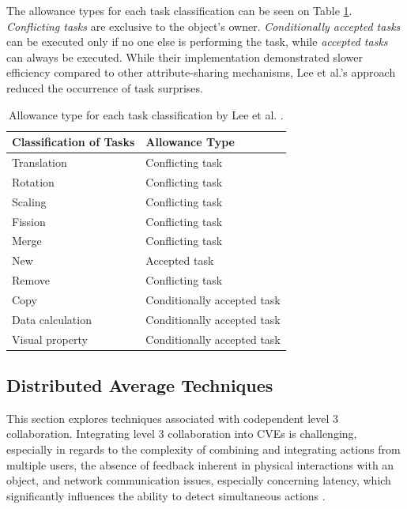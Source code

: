      The allowance types for each task classification can be seen on Table \ref{tab:sota_finegrained}. \textit{Conflicting tasks} are exclusive to the object's owner. \textit{Conditionally accepted tasks} can be executed only if no one else is performing the task, while \textit{accepted tasks} can always be executed. While their implementation demonstrated slower efficiency compared to other attribute-sharing mechanisms, Lee et al.'s approach reduced the occurrence of task surprises.

    \begin{table}[h!]
        \centering
       \caption{Allowance type for each task classification by Lee et al. \cite{leeSupportingFineGrainedConcurrent2012}.}
        \begin{tabular}{m{12em} l}
            \hline
            Classification of Tasks & Allowance Type  \\
            \hline
            Translation & Conflicting task \\
            Rotation & Conflicting task \\
            Scaling & Conflicting task \\
            Fission & Conflicting task \\
            Merge & Conflicting task \\
            New & Accepted task \\
            Remove & Conflicting task \\
            Copy & Conditionally accepted task \\
            Data calculation & Conditionally accepted task \\
            Visual property & Conditionally accepted task \\
        \end{tabular}
 
        \label{tab:sota_finegrained}
    \end{table}
    
    \subsection{Distributed Average Techniques} \label{sec:average_concurrency}

    This section explores techniques associated with codependent level 3 collaboration. Integrating level 3 collaboration into CVEs is challenging, especially in regards to the complexity of combining and integrating actions from multiple users, the absence of feedback inherent in physical interactions with an object, and network communication issues, especially concerning latency, which significantly influences the ability to detect simultaneous actions \cite{ruddleSymmetricAsymmetricAction2002, brollInteractingDistributedCollaborative1995}.
    
